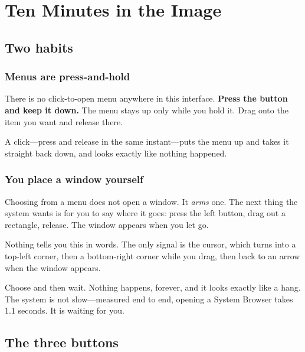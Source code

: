 \chapter{Ten Minutes in the Image}
\label{ch:tenminutes}


\section{Two habits}

\subsection{Menus are press-and-hold}

There is no click-to-open menu anywhere in this interface. \textbf{Press the
button and keep it down.} The menu stays up only while you hold it. Drag onto
the item you want and release there.

A click---press and release in the same instant---puts the menu up and takes
it straight back down, and looks exactly like nothing happened.

\subsection{You place a window yourself}

Choosing  from a menu does not open a window. It \emph{arms} one.
The next thing the system wants is for you to say where it goes: press the
left button, drag out a rectangle, release. The window appears when you let go.

Nothing tells you this in words. The only signal is the cursor, which turns
into a top-left corner, then a bottom-right corner while you drag, then back
to an arrow when the window appears.

\begin{stwarn}
Choose  and then wait. Nothing happens, forever, and it looks
exactly like a hang. The system is not slow---measured end to end, opening a
System Browser takes 1.1 seconds. It is waiting for you.
\end{stwarn}

\section{The three buttons}
\label{sec:buttons}

